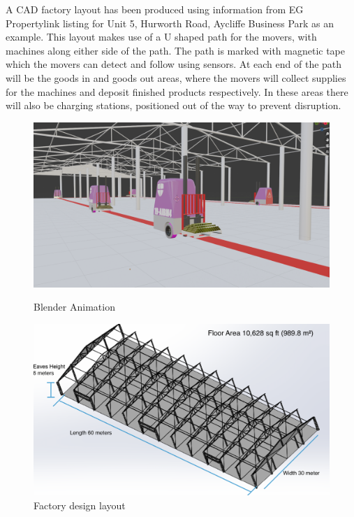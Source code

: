 \documentclass[12pt]{article}
\begin{document}
 \FloatBarrier
A CAD factory layout has been produced using information from EG Propertylink listing for Unit 5, Hurworth Road, Aycliffe Business Park \cite{mileway_hurworth_2024} as an example. This layout makes use of a U shaped path for the movers, with  machines along either side of the path. The path is marked with magnetic tape which the movers can detect and follow using sensors. At each end  of the path will be the goods in and goods out areas, where the movers will collect supplies for the machines and deposit finished products respectively. In these areas there will also be charging stations, positioned out of the way to prevent disruption.
\begin{figure}[ht]
    \centering
    \begin{minipage}{0.45\linewidth}
        \centering
        \includegraphics[width=\linewidth]{factory layout1.png} %
        \caption{Blender Animation}
        \label{fig:blender_animation}

        
    \end{minipage}
    \hspace{0.05\linewidth}
    \begin{minipage}{0.45\linewidth}
        \centering
        \includegraphics[width=\linewidth]{factory layout dimension.png}
        \caption{Factory design layout}
        \label{fig:factory_layout}
    \end{minipage}
\end{figure}
\FloatBarrier
 
\end{document}
